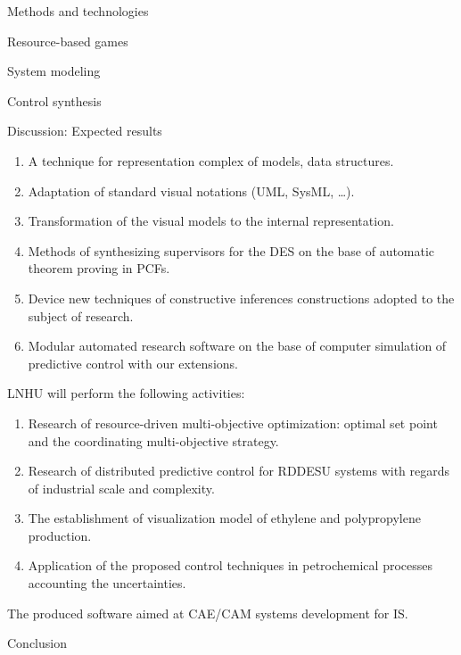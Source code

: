 \documentclass[10pt,dvipsnames]{beamer}
\begin{document}
\begin{frame}{Methods and technologies}
\end{frame}

\begin{frame}{Resource-based games}
\end{frame}

\begin{frame}{System modeling}
\end{frame}

\begin{frame}{Control synthesis}
\end{frame}

\begin{frame}{Discussion: Expected results}
\begin{enumerate}
\item A technique for representation complex of models, data structures.
\item Adaptation of standard visual notations (UML, SysML, \ldots).
\item Transformation of the visual models to the internal representation.
\item Methods of synthesizing supervisors for the DES on the base of automatic theorem proving in PCFs.
\item Device new techniques of constructive inferences constructions adopted to the subject of research.
\item Modular automated research software on the base of computer simulation of predictive control with our extensions.
\end{enumerate}
LNHU will perform the following activities:
\begin{enumerate}
\item Research of resource-driven multi-objective optimization: optimal set point and the coordinating multi-objective strategy.
\item Research of distributed predictive control for RDDESU systems with regards of industrial scale and complexity.
\item The establishment of visualization model of ethylene and polypropylene production.
\item Application of the proposed control techniques in petrochemical processes accounting the uncertainties.
\end{enumerate}

The produced software aimed at CAE/CAM systems development for IS.
\end{frame}

\begin{frame}{Conclusion}
\end{frame}
\end{document}
